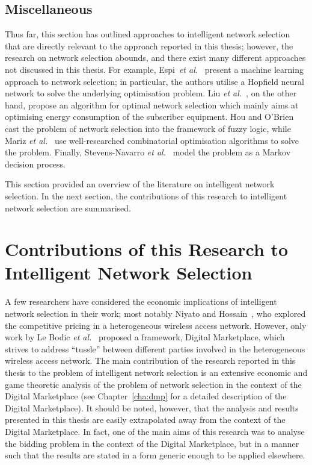 \subsection{Miscellaneous} %
\label{sub:miscellaneous_intelligent}
Thus far, this section has outlined approaches to intelligent network selection that are directly relevant to the approach reported in this thesis; however, the research on network selection abounds, and there exist many different approaches not discussed in this thesis. For example, Espi~\emph{et al.}~\cite{Espi10} present a machine learning approach to network selection; in particular, the authors utilise a Hopfield neural network to solve the underlying optimisation problem. Liu \emph{et al.}~\cite{Liu2009}, on the other hand, propose an algorithm for optimal network selection which mainly aims at optimising energy consumption of the subscriber equipment. Hou and O'Brien~\cite{Hou2006} cast the problem of network selection into the framework of fuzzy logic, while Mariz \emph{et al.}~\cite{Mariz2006} use well-researched combinatorial optimisation algorithms to solve the problem. Finally, Stevens-Navarro \emph{et al.}~\cite{StevensNavarro2008} model the problem as a Markov decision process.

This section provided an overview of the literature on intelligent network selection. In the next section, the contributions of this research to intelligent network selection are summarised.

\section{Contributions of this Research to Intelligent Network Selection} %
\label{sec:contributions_of_this_research_to_intelligent_network_selection_intelligent}
A few researchers have considered the economic implications of intelligent network selection in their work; most notably Niyato and Hossain~\cite{NiyatoHossain2008}, who explored the competitive pricing in a heterogeneous wireless access network. However, only work by Le Bodic \emph{et al.}~\cite{DMLeBodic00} proposed a framework, Digital Marketplace, which strives to address ``tussle'' between different parties involved in the heterogeneous wireless access network. The main contribution of the research reported in this thesis to the problem of intelligent network selection is an extensive economic and game theoretic analysis of the problem of network selection in the context of the Digital Marketplace (see Chapter~\ref{cha:dmp} for a detailed description of the Digital Marketplace). It should be noted, however, that the analysis and results presented in this thesis are easily extrapolated away from the context of the Digital Marketplace. In fact, one of the main aims of this research was to analyse the bidding problem in the context of the Digital Marketplace, but in a manner such that the results are stated in a form generic enough to be applied elsewhere.

